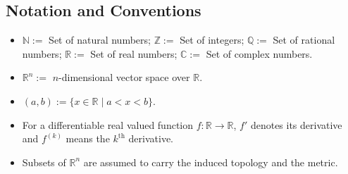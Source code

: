 \documentclass[11pt, a4paper]{article}
\begin{document}
\subsection*{Notation and Conventions}
\begin{itemize}
  \item $\mathbb{N} :=$ Set of natural numbers; $\mathbb{Z} :=$ Set of integers; $\mathbb{Q} :=$ Set of rational numbers; $\mathbb{R} :=$ Set of real numbers; $\mathbb{C} :=$ Set of complex numbers.
  \item $\mathbb{R}^n :=$ $n$-dimensional vector space over $\mathbb{R}$.
  \item $(a, b) := \{x \in \mathbb{R} \mid a < x < b\}$.
  \item For a differentiable real valued function $f: \mathbb{R} \to \mathbb{R}$, $f'$ denotes its derivative and $f^{(k)}$ means the $k^{\text{th}}$ derivative.
  \item Subsets of $\mathbb{R}^n$ are assumed to carry the induced topology and the metric.
\end{itemize}
\end{document}
